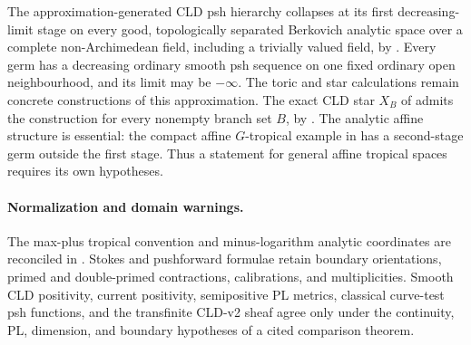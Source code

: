The approximation-generated CLD psh hierarchy collapses at its first
decreasing-limit stage on every good, topologically separated Berkovich
analytic space over a complete non-Archimedean field, including a trivially
valued field, by .
Every germ has a decreasing ordinary smooth psh sequence on one fixed
ordinary open neighbourhood, and its limit may be \(-\infty\).
The toric and star calculations remain concrete constructions of this
approximation. The exact CLD star \(X_B\) of
\cite[\S6.7.3]{CLD25} admits the construction for every nonempty branch set
\(B\), by .
The analytic affine structure is essential: the compact affine
\(G\)-tropical example in 
has a second-stage germ outside the first stage. Thus a statement for
general affine tropical spaces requires its own hypotheses.

\paragraph{Normalization and domain warnings.}
\label{front:part2-normalization-and-domain-warnings}
The max-plus tropical convention and minus-logarithm analytic coordinates
are reconciled in .
Stokes and pushforward formulae retain boundary orientations, primed and
double-primed contractions, calibrations, and multiplicities. Smooth CLD
positivity, current positivity, semipositive PL metrics, classical
curve-test psh functions, and the transfinite CLD-v2 sheaf agree only under
the continuity, PL, dimension, and boundary hypotheses of a cited
comparison theorem.
